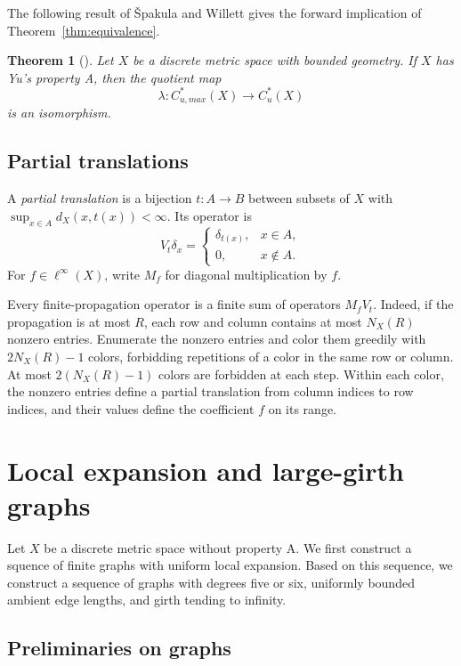 \documentclass[11pt,a4paper]{article}
\newtheorem{theorem}{Theorem}[section]
\theoremstyle{definition}\newtheorem{definition}[theorem]{Definition}
\theoremstyle{remark}\newtheorem{remark}[theorem]{Remark}
\begin{document}
The following result of \v{S}pakula and Willett gives the forward implication of Theorem~\ref{thm:equivalence}.
\begin{theorem}[{\cite[Proposition 1.3]{SW}}]
Let $X$ be a discrete metric space with bounded geometry. If $X$ has Yu's property A, then the quotient map 
    $$
\lambda: C^*_{u,max}(X)\to C^*_{u}(X)
$$
is an isomorphism.
\end{theorem}

\subsection{Partial translations}\label{sec:partial-translations}

A \emph{partial translation} is a bijection $t:A\to B$ between subsets
of $X$ with $\sup_{x\in A}d_X(x,t(x))<\infty$. Its operator is
$$
V_t\delta_x=\begin{cases}\delta_{t(x)},&x\in A,\\0,&x\notin A.\end{cases}
$$
For $f\in\ell^\infty(X)$, write $M_f$ for diagonal multiplication by $f$.

Every finite-propagation operator is a finite sum of operators
$M_f V_t$. Indeed, if the propagation is at most $R$, each row and
column contains at most $N_X(R)$ nonzero entries. Enumerate the
nonzero entries and color them greedily with $2N_X(R)-1$ colors,
forbidding repetitions of a color in the same row or column.
At most $2(N_X(R)-1)$ colors are forbidden at each step. Within each
color, the nonzero entries define a partial translation from column
indices to row indices, and their values define the coefficient $f$
on its range.

\section{Local expansion and large-girth graphs}\label{sec:graphs}

Let $X$ be a discrete metric space without property A. We first construct a squence of finite graphs with uniform local expansion. Based on this sequence, we construct a sequence of graphs
with degrees five or six, uniformly bounded ambient edge lengths, and
girth tending to infinity.

\subsection{Preliminaries on graphs}\label{sec:graph-preliminaries}
\end{document}
